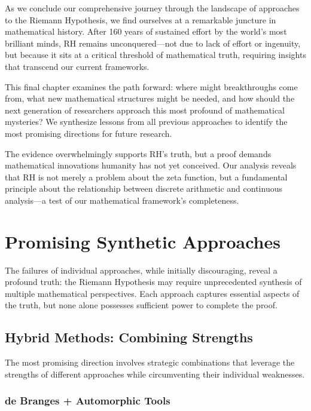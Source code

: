 \label{ch:future}

As we conclude our comprehensive journey through the landscape of approaches to the Riemann Hypothesis, we find ourselves at a remarkable juncture in mathematical history. After 160 years of sustained effort by the world's most brilliant minds, RH remains unconquered—not due to lack of effort or ingenuity, but because it sits at a critical threshold of mathematical truth, requiring insights that transcend our current frameworks.

This final chapter examines the path forward: where might breakthroughs come from, what new mathematical structures might be needed, and how should the next generation of researchers approach this most profound of mathematical mysteries? We synthesize lessons from all previous approaches to identify the most promising directions for future research.

The evidence overwhelmingly supports RH's truth, but a proof demands mathematical innovations humanity has not yet conceived. Our analysis reveals that RH is not merely a problem about the zeta function, but a fundamental principle about the relationship between discrete arithmetic and continuous analysis—a test of our mathematical framework's completeness.

\section{Promising Synthetic Approaches}
\label{sec:synthetic_approaches}

The failures of individual approaches, while initially discouraging, reveal a profound truth: the Riemann Hypothesis may require unprecedented synthesis of multiple mathematical perspectives. Each approach captures essential aspects of the truth, but none alone possesses sufficient power to complete the proof.

\subsection{Hybrid Methods: Combining Strengths}
\label{subsec:hybrid_methods}

The most promising direction involves strategic combinations that leverage the strengths of different approaches while circumventing their individual weaknesses.

\subsubsection{de Branges + Automorphic Tools}
\label{subsubsec:debranges_automorphic}

